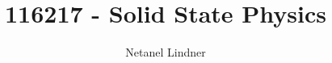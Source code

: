 \documentclass[]{article}
\title{116217 - Solid State Physics}
\author{Netanel Lindner}
\begin{document}
\maketitle

\begin{abstract}

\end{abstract}













\end{document}
